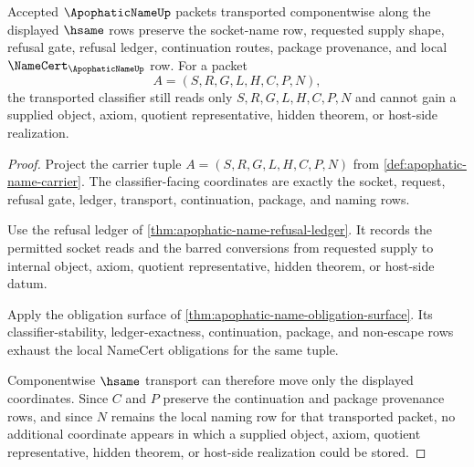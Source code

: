 \begin{theorem}
\label{thm:apophatic-name-classifier-stability}
Accepted $\ApophaticNameUp$ packets transported componentwise along the displayed $\hsame$ rows preserve the socket-name row, requested supply shape, refusal gate, refusal ledger, continuation routes, package provenance, and local $\NameCert_{\ApophaticNameUp}$ row. For a packet
$$
A=(S,R,G,L,H,C,P,N),
$$
the transported classifier still reads only $S,R,G,L,H,C,P,N$ and cannot gain a supplied object, axiom, quotient representative, hidden theorem, or host-side realization.
\end{theorem}
\begin{proof}
Project the carrier tuple $A=(S,R,G,L,H,C,P,N)$ from \autoref{def:apophatic-name-carrier}. The classifier-facing coordinates are exactly the socket, request, refusal gate, ledger, transport, continuation, package, and naming rows.

Use the refusal ledger of \autoref{thm:apophatic-name-refusal-ledger}. It records the permitted socket reads and the barred conversions from requested supply to internal object, axiom, quotient representative, hidden theorem, or host-side datum.

Apply the obligation surface of \autoref{thm:apophatic-name-obligation-surface}. Its classifier-stability, ledger-exactness, continuation, package, and non-escape rows exhaust the local NameCert obligations for the same tuple.

Componentwise $\hsame$ transport can therefore move only the displayed coordinates. Since $C$ and $P$ preserve the continuation and package provenance rows, and since $N$ remains the local naming row for that transported packet, no additional coordinate appears in which a supplied object, axiom, quotient representative, hidden theorem, or host-side realization could be stored.
\end{proof}

